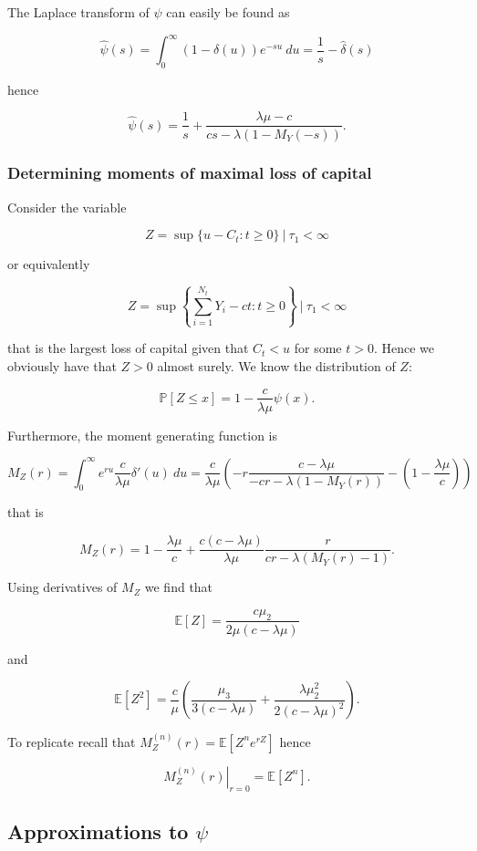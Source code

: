 \documentclass[a4paper,10pt,openany]{book}
\begin{document}
The Laplace transform of \(\psi\) can easily be found as

\[
\hat\psi(s)=\int_0^\infty(1-\delta(u))e^{-su}\ du=\frac{1}{s}-\hat\delta(s)
\]

hence

\[
\hat\psi(s)=\frac{1}{s}+\frac{\lambda \mu-c}{cs-\lambda(1-M_Y(-s))}.
\]

\hypertarget{determining-moments-of-maximal-loss-of-capital}{%
\subsubsection{Determining moments of maximal loss of capital}\label{determining-moments-of-maximal-loss-of-capital}}

Consider the variable

\[
Z=\sup\{u-C_t : t\ge 0\}\ \vert\ \tau_1<\infty
\]

or equivalently

\[
Z=\sup\left\{\sum_{i=1}^{N_t}Y_i-ct : t\ge 0\right\}\ \vert\ \tau_1<\infty
\]

that is the largest loss of capital given that \(C_t<u\) for some \(t>0\). Hence we obviously have that \(Z>0\) almost surely. We know the distribution of \(Z\):

\[
\mathbb P[Z\le x]=1-\frac{c}{\lambda \mu}\psi(x).
\]

Furthermore, the moment generating function is

\[
M_Z(r)=\int_0^\infty e^{ru}\frac{c}{\lambda \mu}\delta'(u)\ du=\frac{c}{\lambda \mu}\left(-r\frac{c-\lambda \mu}{-cr-\lambda(1-M_Y(r))}-\left(1-\frac{\lambda\mu}{c}\right)\right)
\]

that is

\[
M_Z(r)=1-\frac{\lambda\mu}{c}+\frac{c(c-\lambda \mu)}{\lambda\mu}\frac{r}{cr-\lambda(M_Y(r)-1)}.
\]

Using derivatives of \(M_Z\) we find that

\[
\mathbb E[Z]=\frac{c\mu_2}{2\mu(c-\lambda\mu)}
\]

and

\[
\mathbb E[Z^2]=\frac{c}{\mu}\left(\frac{\mu_3}{3(c-\lambda\mu)} + \frac{\lambda\mu_2^2}{2(c-\lambda\mu)^2}\right).
\]

To replicate recall that \(M_Z^{(n)}(r)=\mathbb E[Z^ne^{rZ}]\) hence

\[
\left.M_Z^{(n)}(r)\right\vert_{r=0}=\mathbb E[Z^n].
\]

\hypertarget{approximations-to-psi}{%
\subsection{\texorpdfstring{Approximations to \(\psi\)}{Approximations to \textbackslash psi}}\label{approximations-to-psi}}
\end{document}
